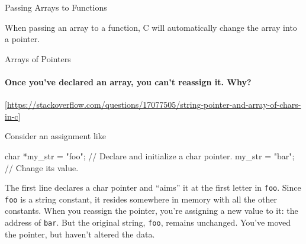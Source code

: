 \begin{frame}{Passing Arrays to Functions}
  \begin{block}{}
    When passing an array to a function, C will automatically change the array into a
    pointer.
  \end{block}  
  \begin{minipage}{.47\linewidth}
    \begin{center}
    \end{center}
  \end{minipage}\hfill
  \begin{minipage}{.47\linewidth}
    \begin{center}
    \end{center}
  \end{minipage}
\end{frame}

\begin{frame}[fragile]{Arrays of Pointers}
  \begin{center}
  \end{center}
\end{frame}

\paragraph*{Once you've declared an array, you can't reassign it. Why?}
[\url{https://stackoverflow.com/questions/17077505/string-pointer-and-array-of-chars-in-c}]

Consider an assignment like

\begin{ccode}
char *my_str = "foo"; // Declare and initialize a char pointer.
my_str = "bar"; // Change its value.
\end{ccode}

The first line declares a char pointer and ``aims'' it at the first letter in \texttt{foo}. Since \texttt{foo} is a string constant, it resides somewhere in memory with all the other constants. When you reassign the pointer, you're assigning a new value to it: the address of \texttt{bar}. But the original string, \texttt{foo}, remains unchanged. You've moved the pointer, but haven't altered the data.

